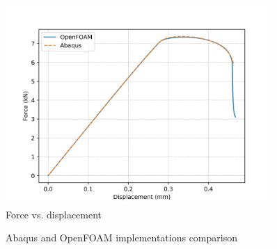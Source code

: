 \documentclass[sn-mathphys,Numbered,draft]{sn-jnl}%
\begin{document}
\begin{figure}[htb]
\begin{center}
	\includegraphics[width=0.9\textwidth]{./Figures/LemaitreCompare/borden/bordenDispForce.png}
\caption{Force vs. displacement}
\label{fig:notchedRoundBAr}
\end{center}
\end{figure}

\begin{figure}[t!]
	\centering
	
		
		\caption{Abaqus and OpenFOAM implementations comparison}
	\label{label_for_entire_figure}
\end{figure}
\FloatBarrier
\end{document}
